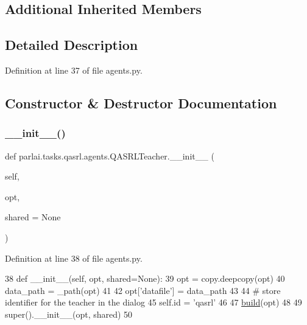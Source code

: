 \subsection*{Additional Inherited Members}


\subsection{Detailed Description}


Definition at line 37 of file agents.\+py.



\subsection{Constructor \& Destructor Documentation}
\mbox{\label{classparlai_1_1tasks_1_1qasrl_1_1agents_1_1QASRLTeacher_a53eb0fa6773eb55e1a9088f78930c9c6}} 
\subsubsection{\texorpdfstring{\+\_\+\+\_\+init\+\_\+\+\_\+()}{\_\_init\_\_()}}
{\footnotesize\ttfamily def parlai.\+tasks.\+qasrl.\+agents.\+Q\+A\+S\+R\+L\+Teacher.\+\_\+\+\_\+init\+\_\+\+\_\+ (\begin{DoxyParamCaption}\item[{}]{self,  }\item[{}]{opt,  }\item[{}]{shared = {\ttfamily None} }\end{DoxyParamCaption})}



Definition at line 38 of file agents.\+py.


\begin{DoxyCode}
38     \textcolor{keyword}{def }\_\_init\_\_(self, opt, shared=None):
39         opt = copy.deepcopy(opt)
40         data\_path = \_path(opt)
41 
42         opt[\textcolor{stringliteral}{'datafile'}] = data\_path
43 
44         \textcolor{comment}{# store identifier for the teacher in the dialog}
45         self.id = \textcolor{stringliteral}{'qasrl'}
46 
47         \hyperlink{namespaceparlai_1_1mturk_1_1tasks_1_1talkthewalk_1_1download_a8c0fbb9b6dfe127cb8c1bd6e7c4e33fd}{build}(opt)
48 
49         super().\_\_init\_\_(opt, shared)
50 
\end{DoxyCode}


